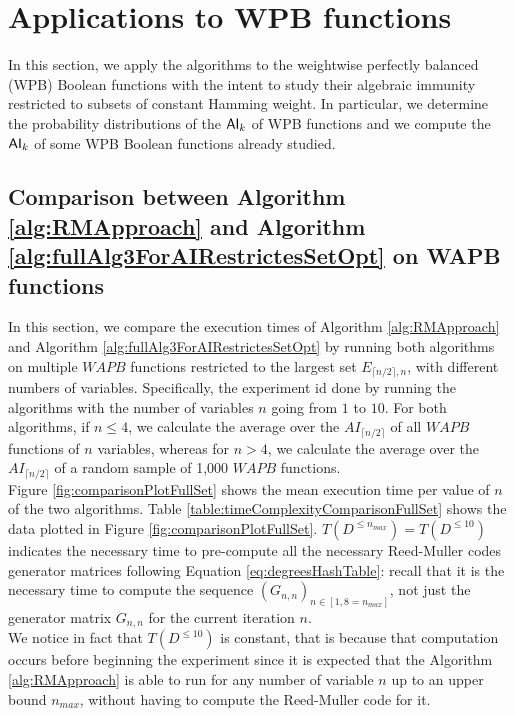\documentclass[11pt]{llncs}
\begin{document}
\section{Applications to WPB functions}
In this section, we apply the algorithms to the weightwise perfectly balanced (WPB) Boolean functions with the intent to study their algebraic immunity restricted to subsets of constant Hamming weight. In particular, we determine the probability distributions of the $\mathsf{AI}_{k}$ of WPB functions and we compute the $\mathsf{AI}_{k}$ of some WPB Boolean functions already studied.

\subsection{Comparison between Algorithm \ref{alg:RMApproach} and Algorithm \ref{alg:fullAlg3ForAIRestrictesSetOpt} on WAPB functions}
In this section, we compare the execution times of Algorithm \ref{alg:RMApproach} and Algorithm \ref{alg:fullAlg3ForAIRestrictesSetOpt} by running both algorithms on multiple $WAPB$ functions restricted to the largest set $E_{\lceil{n/2}\rceil,n}$, with different numbers of variables. Specifically, the experiment id done by running the algorithms with the number of variables $n$ going from $1$ to $10$. For both algorithms, if $n \leq 4$, we calculate the average over the $AI_{\lceil{n/2}\rceil}$ of all $WAPB$ functions of $n$ variables, whereas for $n > 4$, we calculate the average over the $AI_{\lceil{n/2}\rceil}$ of a random sample of 1,000 $WAPB$ functions.\\
Figure \ref{fig:comparisonPlotFullSet} shows the mean execution time per value of $n$ of the two algorithms.
Table \ref{table:timeComplexityComparisonFullSet} shows the data plotted in Figure \ref{fig:comparisonPlotFullSet}. $T\left(D^{\leq n_{max}}\right) = T\left(D^{\leq 10}\right)$ indicates the necessary time to pre-compute all the necessary Reed-Muller codes generator matrices following Equation \eqref{eq:degreesHashTable}: recall that it is the necessary time to compute the sequence $\left(G_{n,n}\right)_{n\in [1,8=n_{max}]}$, not just the generator matrix $G_{n,n}$ for the current iteration $n$.\\
We notice in fact that $T\left(D^{\leq 10}\right)$ is constant, that is because that computation occurs before beginning the experiment since it is expected that the Algorithm \ref{alg:RMApproach} is able to run for any number of variable $n$ up to an upper bound $n_{max}$, without having to compute the Reed-Muller code for it.
\end{document}

